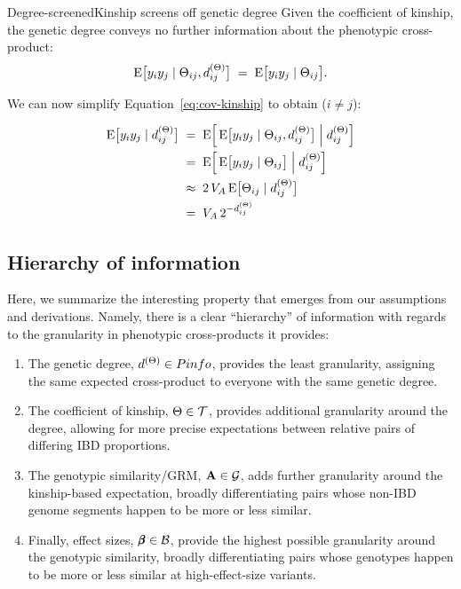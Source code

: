 \documentclass[12pt]{article}
\numberwithin{equation}{section}
\begin{document}
\begin{assumption}{Degree-screened}{Kinship screens off genetic degree}
Given the coefficient of kinship, the genetic degree conveys no further information about the phenotypic cross-product:
$$ \mathrm{E}\big[y_i y_j \mid \Theta_{ij}, d^{(\Theta)}_{ij}\big] \;=\; \mathrm{E}\big[y_i y_j \mid \Theta_{ij}\big] . $$
\end{assumption}

We can now simplify Equation~\eqref{eq:cov-kinship} to obtain ($i \neq j$):

\begin{equation}\label{eq:cov-degree}
\begin{aligned}
    \mathrm{E}\big[y_i y_j \mid d^{(\Theta)}_{ij}\big]
    \;&=\; \mathrm{E}\Big[\, \mathrm{E}\big[y_i y_j \mid \Theta_{ij}, d^{(\Theta)}_{ij}\big] \;\Big|\; d^{(\Theta)}_{ij} \Big] \\
    \;&=\; \mathrm{E}\Big[\, \mathrm{E}\big[y_i y_j \mid \Theta_{ij}\big] \;\Big|\; d^{(\Theta)}_{ij} \Big] \\
    \;&\approx\; 2\, V_A\, \mathrm{E}\big[\Theta_{ij} \mid d^{(\Theta)}_{ij}\big] \\
    \;&=\; V_A\, 2^{-d^{(\Theta)}_{ij}}
\end{aligned}
\end{equation}

\subsection{Hierarchy of information}
Here, we summarize the interesting property that emerges from our assumptions and derivations.
Namely, there is a clear ``hierarchy'' of information with regards to the granularity in phenotypic cross-products it provides:
\begin{enumerate}[nosep]
    \item The genetic degree, $d^{(\Theta)} \in Pinfo$, provides the least granularity, assigning the same expected cross-product to everyone with the same genetic degree.
    \item The coefficient of kinship, $\Theta \in \mathcal{T}$, provides additional granularity around the degree, allowing for more precise expectations between relative pairs of differing IBD proportions.
    \item The genotypic similarity/GRM, $\mathbf{A} \in \mathcal{G}$, adds further granularity around the kinship-based expectation, broadly differentiating pairs whose non-IBD genome segments happen to be more or less similar.
    \item Finally, effect sizes, $\pmb{\beta} \in \mathcal{B}$, provide the highest possible granularity around the genotypic similarity, broadly differentiating pairs whose genotypes happen to be more or less similar at high-effect-size variants.
\end{enumerate}
\end{document}
